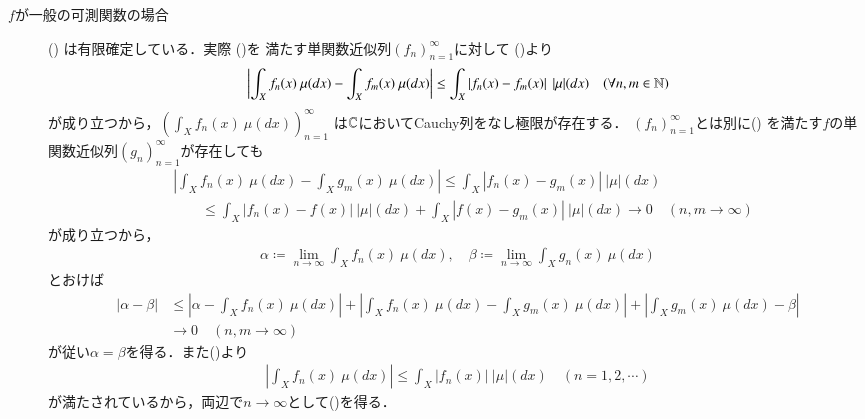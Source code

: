 \begin{prf}
\begin{description}
			\item[$f$が一般の可測関数の場合]
				()
				は有限確定している．実際
				()を
				満たす単関数近似列$(f_n)_{n=1}^{\infty}$に対して
				()より
				\begin{align}
					\left| \int_X f_n(x)\ \mu(dx) - \int_X f_m(x)\ \mu(dx) \right|
					\leq \int_X \left| f_n(x) - f_m(x) \right|\ |\mu|(dx)
					\quad (\forall n,m \in \N)
				\end{align}
				が成り立つから，$\left( \int_X f_n(x)\ \mu(dx) \right)_{n=1}^{\infty}$
				は$\mathbb{C}$においてCauchy列をなし極限が存在する．
				$(f_n)_{n=1}^{\infty}$とは別に()
				を満たす$f$の単関数近似列$(g_n)_{n=1}^{\infty}$が存在しても
				\begin{align}
					&\left| \int_X f_n(x)\ \mu(dx) - \int_X g_m(x)\ \mu(dx) \right|
					\leq \int_X \left| f_n(x) - g_m(x) \right|\ |\mu|(dx) \\
					&\qquad \leq \int_X \left| f_n(x) - f(x) \right|\ |\mu|(dx)
						+ \int_X \left| f(x) - g_m(x) \right|\ |\mu|(dx)
					\longrightarrow 0 \quad (n,m \longrightarrow \infty)
				\end{align}
				が成り立つから，
				\begin{align}
					\alpha \coloneqq \lim_{n \to \infty} \int_X f_n(x)\ \mu(dx),
					\quad \beta \coloneqq \lim_{n \to \infty} \int_X g_n(x)\ \mu(dx)
				\end{align}
				とおけば
				\begin{align}
					|\alpha - \beta|
					&\leq \left| \alpha - \int_X f_n(x)\ \mu(dx) \right|
						+ \left| \int_X f_n(x)\ \mu(dx) - \int_X g_m(x)\ \mu(dx) \right|
						+ \left| \int_X g_m(x)\ \mu(dx) - \beta \right| \\
					&\longrightarrow 0 \quad (n,m \longrightarrow \infty)
				\end{align}
				が従い$\alpha = \beta$を得る．また()より
				\begin{align}
					\left| \int_X f_n(x)\ \mu(dx) \right| \leq \int_X |f_n(x)|\ |\mu|(dx) \quad (n = 1,2,\cdots)
				\end{align}
				が満たされているから，両辺で$n \longrightarrow \infty$として()を得る．
				\QED
		\end{description}
	\end{prf}
	

